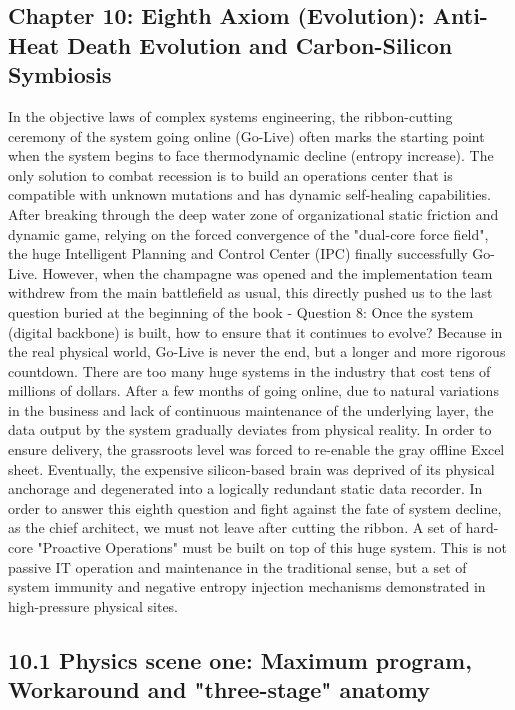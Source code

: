 \documentclass[11pt,a4paper]{article}
\begin{document}
\subsection*{Chapter 10: Eighth Axiom (Evolution): Anti-Heat Death Evolution and Carbon-Silicon Symbiosis}
In the objective laws of complex systems engineering, the ribbon-cutting ceremony of the system going online (Go-Live) often marks the starting point when the system begins to face thermodynamic decline (entropy increase). The only solution to combat recession is to build an operations center that is compatible with unknown mutations and has dynamic self-healing capabilities. After breaking through the deep water zone of organizational static friction and dynamic game, relying on the forced convergence of the "dual-core force field", the huge Intelligent Planning and Control Center (IPC) finally successfully Go-Live. However, when the champagne was opened and the implementation team withdrew from the main battlefield as usual, this directly pushed us to the last question buried at the beginning of the book - Question 8: Once the system (digital backbone) is built, how to ensure that it continues to evolve? Because in the real physical world, Go-Live is never the end, but a longer and more rigorous countdown. There are too many huge systems in the industry that cost tens of millions of dollars. After a few months of going online, due to natural variations in the business and lack of continuous maintenance of the underlying layer, the data output by the system gradually deviates from physical reality. In order to ensure delivery, the grassroots level was forced to re-enable the gray offline Excel sheet. Eventually, the expensive silicon-based brain was deprived of its physical anchorage and degenerated into a logically redundant static data recorder. In order to answer this eighth question and fight against the fate of system decline, as the chief architect, we must not leave after cutting the ribbon. A set of hard-core "Proactive Operations" must be built on top of this huge system. This is not passive IT operation and maintenance in the traditional sense, but a set of system immunity and negative entropy injection mechanisms demonstrated in high-pressure physical sites.


\subsection*{10.1 Physics scene one: Maximum program, Workaround and "three-stage" anatomy}
\end{document}
